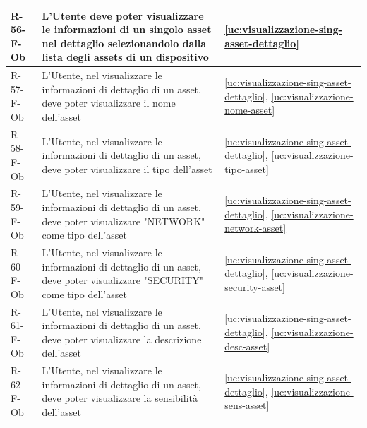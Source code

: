 ﻿\documentclass[a4paper,12pt]{article}
\begin{document}
{{\begin{longtable}{|l|p{}|p{}|}
            R-56-F-Ob       & L'Utente deve poter visualizzare le informazioni di un singolo asset nel dettaglio selezionandolo dalla lista degli assets di un dispositivo                                                & \ref{uc:visualizzazione-sing-asset-dettaglio}                                              \\ \hline
            R-57-F-Ob       & L'Utente, nel visualizzare le informazioni di dettaglio di un asset, deve poter visualizzare il nome dell'asset                                                                             & \ref{uc:visualizzazione-sing-asset-dettaglio}, \ref{uc:visualizzazione-nome-asset}                 \\ \hline
            R-58-F-Ob       & L'Utente, nel visualizzare le informazioni di dettaglio di un asset, deve poter visualizzare il tipo dell'asset                                                                             & \ref{uc:visualizzazione-sing-asset-dettaglio}, \ref{uc:visualizzazione-tipo-asset}                 \\ \hline
            R-59-F-Ob       & L'Utente, nel visualizzare le informazioni di dettaglio di un asset, deve poter visualizzare "NETWORK" come tipo dell'asset                                                                             & \ref{uc:visualizzazione-sing-asset-dettaglio}, \ref{uc:visualizzazione-network-asset}                 \\ \hline
            R-60-F-Ob       & L'Utente, nel visualizzare le informazioni di dettaglio di un asset, deve poter visualizzare "SECURITY" come tipo dell'asset                                                                             & \ref{uc:visualizzazione-sing-asset-dettaglio}, \ref{uc:visualizzazione-security-asset}                 \\ \hline
            R-61-F-Ob       & L'Utente, nel visualizzare le informazioni di dettaglio di un asset, deve poter visualizzare la descrizione dell'asset                                                                      & \ref{uc:visualizzazione-sing-asset-dettaglio}, \ref{uc:visualizzazione-desc-asset}                 \\ \hline
            R-62-F-Ob       & L'Utente, nel visualizzare le informazioni di dettaglio di un asset, deve poter visualizzare la sensibilità dell'asset                                                                      & \ref{uc:visualizzazione-sing-asset-dettaglio}, \ref{uc:visualizzazione-sens-asset}                 \\ \hline

\end{longtable}}}
\end{document}
